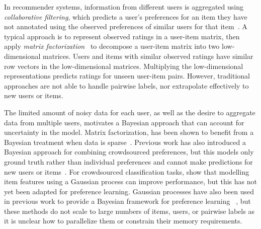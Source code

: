 In recommender systems, information from different users is aggregated using \emph{collaborative filtering},  
which predicts a user's preferences for an item they have not annotated using the observed preferences of 
similar users for that item~\citep{resnick1997recommender}.
A typical approach is to represent observed ratings in a user-item matrix,
then apply \emph{matrix factorization}~\citep{koren2009matrix}
to decompose a user-item matrix into two low-dimensional matrices.
Users and items with similar observed ratings have similar row vectors in the low-dimensional
matrices. Multiplying the low-dimensional representations predicts ratings for unseen
user-item pairs. 
However, traditional approaches are not able to handle pairwise labels,
nor extrapolate effectively to new users or items.

The limited amount of noisy data for each user,
as well as the desire to aggregate data from multiple users,
motivates a Bayesian approach that can account for uncertainty in the model.
Matrix factorization, has been shown to benefit from a Bayesian treatment when data is sparse~\citep{salakhutdinov2008bayesian}. 
Previous work has also introduced a Bayesian approach for combining crowdsourced preferences, but this models only ground truth rather than individual preferences and cannot make predictions for new users or items~\citep{chen2013pairwise}.
For crowdsourced classification tasks, \citet{simpson2017bayesian} show that modelling item features using a Gaussian process can improve performance, but this has not yet been adapted for preference learning.
Gaussian processes have also been used in previous work to provide a Bayesian framework for preference learning
~\citep{chu2005preference,houlsby2012collaborative,khan2014scalable}, 
but these methods do not scale to large numbers of items, users, or
pairwise labels as it is unclear how to parallelize them or constrain their memory requirements.

